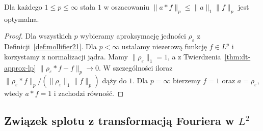 \begin{wniosek}
\label{cor:dt-young-endpoint-sharp}
Dla każdego $1\le p\le\infty$ stała $1$ w oszacowaniu
$\|a*f\|_p\le\|a\|_1\|f\|_p$ jest optymalna.
\end{wniosek}
\begin{proof}
Dla wszystkich $p$ wybieramy aproksymację jedności
$\rho_\varepsilon$ z Definicji~\ref{def:mollifier21}.
Dla $p<\infty$ ustalamy niezerową funkcję $f\in L^p$
i korzystamy z normalizacji jądra. Mamy
$\|\rho_\varepsilon\|_1=1$, a z
Twierdzenia~\ref{thm:dt-approx-lp}
$\|\rho_\varepsilon*f-f\|_p\to0$.
W szczególności iloraz
$\|\rho_\varepsilon*f\|_p/
(\|\rho_\varepsilon\|_1\|f\|_p)$ dąży do $1$.
Dla $p=\infty$ bierzemy $f=1$ oraz
$a=\rho_\varepsilon$, wtedy $a*f=1$ i zachodzi równość.
\end{proof}

\subsection{Związek splotu z transformacją Fouriera w \texorpdfstring{$L^2$}{L2}}

